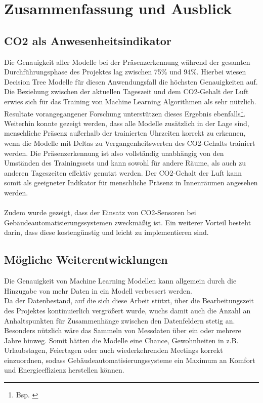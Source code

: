 \clearpage
\chapter{\textbf{Zusammenfassung und Ausblick}}\label{zusammenfassung}

\section{CO2 als Anwesenheitsindikator}
Die Genauigkeit aller Modelle bei der Präsenzerkennung während der gesamten Durchführungsphase des Projektes 
lag zwischen 75\% und 94\%.
Hierbei wiesen Decision Tree Modelle für diesen Anwendungsfall die höchsten Genauigkeiten auf. 
Die Beziehung zwischen der aktuellen Tageszeit und dem CO2-Gehalt der Luft erwies sich für das Training von 
Machine Learning Algorithmen als sehr nützlich. 
Resultate vorangegangener Forschung unterstützen dieses Ergebnis ebenfalls\footnote[1]{Bsp. \cite{IPPR}}.\\
Weiterhin konnte gezeigt werden, dass alle Modelle zusätzlich in der Lage sind, menschliche Präsenz außerhalb
der trainierten Uhrzeiten korrekt zu erkennen, wenn die Modelle mit Deltas zu Vergangenheitswerten des 
CO2-Gehalts trainiert werden. Die Präsenzerkennung ist also vollständig unabhängig von den Umständen des
Trainingssets und kann sowohl für andere Räume, als auch zu anderen Tageszeiten effektiv genutzt werden. 
Der CO2-Gehalt der Luft kann somit als geeigneter Indikator für menschliche Präsenz in Innenräumen angesehen 
werden.\\\\
Zudem wurde gezeigt, dass der Einsatz von CO2-Sensoren bei Gebäudeautomatisierungssystemen zweckmäßig ist.
Ein weiterer Vorteil besteht darin, dass diese kostengünstig und leicht zu implementieren sind.


\section{Mögliche Weiterentwicklungen}
Die Genauigkeit von Machine Learning Modellen kann allgemein durch die Hinzugabe von mehr Daten in ein Modell 
verbessert werden. \\
Da der Datenbestand, auf die sich diese Arbeit stützt, über die Bearbeitungszeit des Projektes 
kontinuierlich vergrößert wurde, wuchs damit auch die Anzahl an Anhaltspunkten für Zusammenhänge zwischen den 
Datenfeldern stetig an. Besonders nützlich wäre das Sammeln von Messdaten über ein oder mehrere Jahre hinweg.
Somit hätten die Modelle eine Chance, Gewohnheiten in z.B. Urlaubstagen, Feiertagen oder auch wiederkehrenden
Meetings korrekt einzuordnen, sodass Gebäudeautomatisierungssysteme ein Maximum an Komfort und Energieeffizienz
herstellen können.

